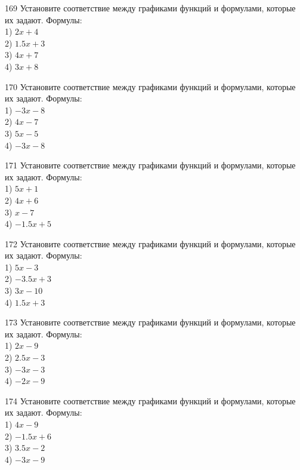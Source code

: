 \documentclass[4apaper]{article}
\begin{document}
\begin{taskBN}{169}
Установите соответствие между графиками функций и формулами, которые их задают. Формулы: \\1) $2x+4$\\2) $1.5x+3$\\3) $4x+7$\\4) $3x+8$
\end{taskBN}

\begin{taskBN}{170}
Установите соответствие между графиками функций и формулами, которые их задают. Формулы: \\1) $-3x-8$\\2) $4x-7$\\3) $5x-5$\\4) $-3x-8$
\end{taskBN}

\begin{taskBN}{171}
Установите соответствие между графиками функций и формулами, которые их задают. Формулы: \\1) $5x+1$\\2) $4x+6$\\3) $x-7$\\4) $-1.5x+5$
\end{taskBN}

\begin{taskBN}{172}
Установите соответствие между графиками функций и формулами, которые их задают. Формулы: \\1) $5x-3$\\2) $-3.5x+3$\\3) $3x-10$\\4) $1.5x+3$
\end{taskBN}

\begin{taskBN}{173}
Установите соответствие между графиками функций и формулами, которые их задают. Формулы: \\1) $2x-9$\\2) $2.5x-3$\\3) $-3x-3$\\4) $-2x-9$
\end{taskBN}

\begin{taskBN}{174}
Установите соответствие между графиками функций и формулами, которые их задают. Формулы: \\1) $4x-9$\\2) $-1.5x+6$\\3) $3.5x-2$\\4) $-3x-9$
\end{taskBN}
\end{document}
